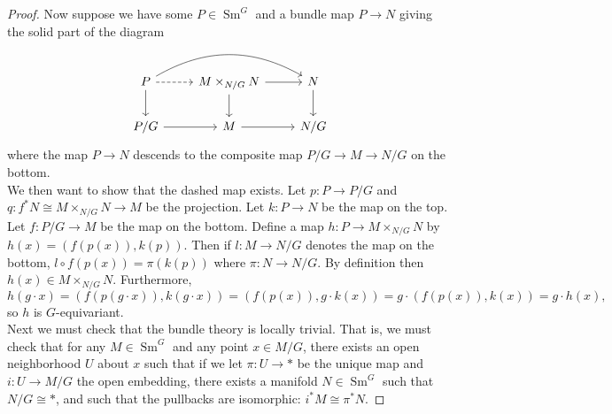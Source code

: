 \documentclass[reqno]{amsart}
\theoremstyle{definition}
\theoremstyle{remark}
\DeclareMathOperator{\Sm}{Sm}
\begin{document}
\begin{proof}
        Now suppose we have some 
        $P \in \Sm^{G}$ and a bundle map
        $P \to N$ giving the solid part of the diagram
        \begin{equation*}
        \begin{tikzcd}
            P \ar[rr, bend left] \ar[d] 
            \ar[r, dashed]& M \times_{N /G} N
            \ar[r] \ar[d] & N \ar[d]\\
            P /G \ar[r] & M \ar[r] & N /G
        \end{tikzcd}
        \end{equation*}
        where the map $P \to N$ descends to the composite map
        $P /G \to M \to N /G$ on the bottom.\\
        
        We then want to show that the dashed map
        exists. Let
        $p \colon P \to P /G$ and
        $q \colon f^{*}N \cong M \times_{N /G} N
        \to M$ be the projection. Let
        $k \colon P \to N$ be the map
        on the top. Let
        $f \colon P /G \to M$ be the map on the bottom.
        Define a map
        $h \colon P \to 
        M \times_{N /G}N$ by
        $h(x) =
        \left( f (p(x)), k(p) \right) $.
        Then if
        $l \colon M \to N /G$ denotes the map on the bottom,
        $l \circ f\left( p(x) \right) 
        = \pi \left( k(p) \right) $ where
        $\pi \colon N \to N /G$. By definition then
        $h(x) \in M \times_{N /G} N$.
        Furthermore,
        \[
        h \left( g \cdot x \right) 
        = \left( f\left( p \left( g\cdot x \right)  \right) ,
        k\left( g\cdot x \right) \right) 
        = \left( f \left( p \left( x \right)  \right) ,
        g \cdot k(x)\right) 
        = g\cdot \left( f \left( p(x) \right) ,
        k(x)\right) =
        g\cdot h(x),
        \] 
        so $h$ is $G$-equivariant.\\
        \linebreak
        Next we must check that the bundle theory
        is locally trivial. That is, we
        must check that
        for any $M \in \Sm^{G}$ and
        any point $x \in M /G$, there
        exists an open neighborhood
        $U$ about $x$ such that if we let
        $\pi \colon U \to *$ be the unique map and
        $i \colon U \to M /G$ the
        open embedding, there
        exists a manifold $N \in \Sm^{G}$ such that
        $N /G \cong *$, and such that
        the pullbacks are isomorphic:
        $i^{*}M \cong \pi^{*} N$.


\end{proof}
\end{document}
